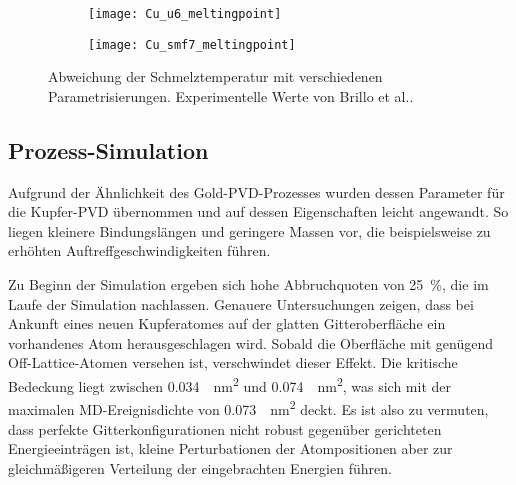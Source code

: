 \begin{figure}[bht]
  \captionsetup[subfigure]{singlelinecheck=false}
  \def\subfigwidth{7cm}
  \begin{subfigure}[t]{\subfigwidth}
    \texttt{[image: Cu\_u6\_meltingpoint]}
  \end{subfigure}
  \hfill
  \begin{subfigure}[t]{\subfigwidth}
    \texttt{[image: Cu\_smf7\_meltingpoint]}
  \end{subfigure}
  \caption[Abweichung der Schmelztemperaturen bei Kupfer-MD]{
    Abweichung der Schmelztemperatur mit verschiedenen Parametrisierungen.
    Experimentelle Werte von Brillo et al.\cite{brillo_density_2006}.
  }
  \label{fig:copperthermo}
\end{figure}

\subsection{Prozess-Simulation}

Aufgrund der Ähnlichkeit des Gold-PVD-Prozesses wurden dessen Parameter für die Kupfer-PVD übernommen und auf dessen Eigenschaften leicht angewandt.
So liegen kleinere Bindungslängen und geringere Massen vor, die beispielsweise zu erhöhten Auftreffgeschwindigkeiten führen.

Zu Beginn der Simulation ergeben sich hohe Abbruchquoten von \SI{25}{\percent}, die im Laufe der Simulation nachlassen.
Genauere Untersuchungen zeigen, dass bei Ankunft eines neuen Kupferatomes auf der glatten Gitteroberfläche ein vorhandenes Atom herausgeschlagen wird.
Sobald die Oberfläche mit genügend Off-Lattice-Atomen versehen ist, verschwindet dieser Effekt.
Die kritische Bedeckung liegt zwischen \SI{0.034}{\per\nano\meter\squared} und \SI{0.074}{\per\nano\meter\squared}, was sich mit der maximalen MD-Ereignisdichte von \SI{0.073}{\per\nano\meter\squared} deckt.
Es ist also zu vermuten, dass perfekte Gitterkonfigurationen nicht robust gegenüber gerichteten Energieeinträgen ist, kleine Perturbationen der Atompositionen aber zur gleichmäßigeren Verteilung der eingebrachten Energien führen.

